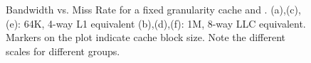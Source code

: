{\begin{figure}[ht]
    

  \caption[Bandwidth vs. Miss Rate]{Bandwidth vs. Miss Rate for a fixed granularity cache and \AC{}. (a),(c),(e): 64K, 4-way L1 equivalent (b),(d),(f): 1M, 8-way LLC equivalent.  Markers on the plot indicate cache block size. Note the different scales for different groups.}
  \label{fig:eval_scatter_bw_64k_1m}
\end{figure}

}
